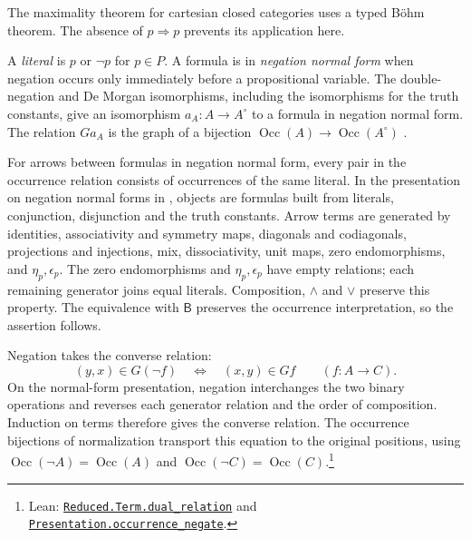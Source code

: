 \documentclass[11pt]{article}
\newcommand{\B}{\mathsf B}
\newcommand{\Occ}{\operatorname{Occ}}
\begin{document}
The maximality theorem for cartesian closed categories
\cite[\S11]{DPCCC} uses a typed B\"ohm theorem.
The absence of $p\Rightarrow p$ prevents its application here.

A \emph{literal} is $p$ or $\neg p$ for $p\in P$.
A formula is in \emph{negation normal form} when negation occurs only
immediately before a propositional variable. The double-negation and
De Morgan isomorphisms, including the isomorphisms for the truth
constants, give an isomorphism $a_A:A\to A^\circ$ to a formula in
negation normal form. The relation $Ga_A$ is the graph of a bijection
$\Occ(A)\to\Occ(A^\circ)$
\cite[\S14.1, pp.~313--315]{DP}.

For arrows between formulas in negation normal form, every pair in
the occurrence relation consists of occurrences of the same literal.
In the presentation on negation normal forms in
\cite[\S14.2, pp.~318--321]{DP}, objects are formulas built from
literals, conjunction, disjunction and the truth constants.
Arrow terms are generated by identities, associativity and symmetry
maps, diagonals and codiagonals, projections and injections, mix,
dissociativity, unit maps, zero endomorphisms, and $\eta_p,\epsilon_p$.
The zero endomorphisms and $\eta_p,\epsilon_p$ have empty relations;
each remaining generator joins equal literals.
Composition, $\wedge$ and $\vee$ preserve this property.
The equivalence with $\B$ preserves the occurrence interpretation,
so the assertion follows.

Negation takes the converse relation:
\[
 (y,x)\in G(\neg f)\quad\Longleftrightarrow\quad(x,y)\in Gf
 \qquad(f:A\to C).
\]
On the normal-form presentation, negation interchanges the two
binary operations and reverses each generator relation and the
order of composition. Induction on terms therefore gives the
converse relation. The occurrence bijections of normalization
transport this equation to the original positions, using
$\Occ(\neg A)=\Occ(A)$ and $\Occ(\neg C)=\Occ(C)$.\footnote{\raggedright Lean:
\href{https://github.com/flengyel/Dosen-Petric-Maximality/blob/5dbee39bea09539bd130f729e82636419f71f920/DosenPetric/ReducedDualRelations.lean\#L20}{\texttt{Reduced.Term.\allowbreak{}dual\_relation}} and
\href{https://github.com/flengyel/Dosen-Petric-Maximality/blob/5dbee39bea09539bd130f729e82636419f71f920/DosenPetric/PresentationNegationOccurrence.lean\#L25}{\texttt{Presentation.\allowbreak{}occurrence\_negate}}.}
\end{document}
